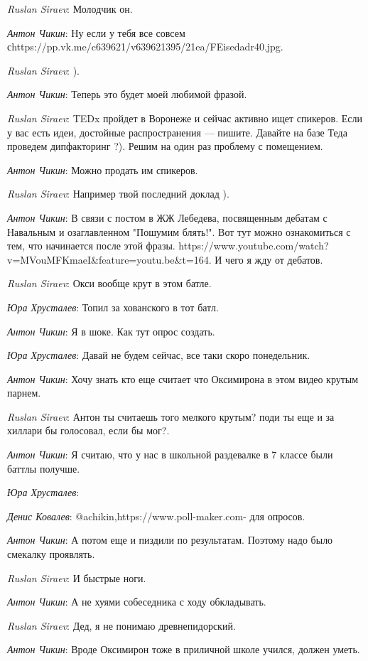 \documentclass[10pt]{book}
\newcommand{\AUTHOR}[1]{\emph{#1}:}
\begin{document}
\AUTHOR{Ruslan Siraev} Молодчик он.

\AUTHOR{Антон Чикин} Ну если у тебя все совсем сhttps://pp.vk.me/c639621/v639621395/21ea/FEisedadr40.jpg.

\AUTHOR{Ruslan Siraev} ).

\AUTHOR{Антон Чикин} Теперь это будет моей любимой фразой.

\AUTHOR{Ruslan Siraev} TEDx пройдет в Воронеже и сейчас активно ищет спикеров. Если у вас есть идеи, достойные распространения — пишите. Давайте на базе Теда проведем дипфакторинг ?). Решим на один раз проблему с помещением.

\AUTHOR{Антон Чикин} Можно продать им спикеров.

\AUTHOR{Ruslan Siraev} Например твой последний доклад ).

\AUTHOR{Антон Чикин} В связи с постом в ЖЖ Лебедева, посвященным дебатам с Навальным и озаглавленном "Пошумим блять!". Вот тут можно ознакомиться с тем, что начинается после этой фразы. https://www.youtube.com/watch?v=MVouMFKmaeI&feature=youtu.be&t=164. И чего я жду от дебатов.

\AUTHOR{Ruslan Siraev} Окси вообще крут в этом батле.

\AUTHOR{Юра Хрусталев} Топил за хованского в тот батл.

\AUTHOR{Антон Чикин} Я в шоке. Как тут опрос создать.

\AUTHOR{Юра Хрусталев} Давай не будем сейчас, все таки скоро понедельник.

\AUTHOR{Антон Чикин} Хочу знать кто еще считает что Оксимирона в этом видео крутым парнем.

\AUTHOR{Ruslan Siraev} Антон ты считаешь того мелкого крутым? поди ты еще и за хиллари бы голосовал, если бы мог?.

\AUTHOR{Антон Чикин} Я считаю, что у нас в школьной раздевалке в 7 классе были баттлы получше.

\AUTHOR{Юра Хрусталев}

\AUTHOR{Денис Ковалев} @achikin,https://www.poll-maker.com- для опросов.

\AUTHOR{Антон Чикин} А потом еще и пиздили по результатам. Поэтому надо было смекалку проявлять.

\AUTHOR{Ruslan Siraev} И быстрые ноги.

\AUTHOR{Антон Чикин} А не хуями собеседника с ходу обкладывать.

\AUTHOR{Ruslan Siraev} Дед, я не понимаю древнепидорский.

\AUTHOR{Антон Чикин} Вроде Оксимирон тоже в приличной школе учился, должен уметь.
\end{document}
